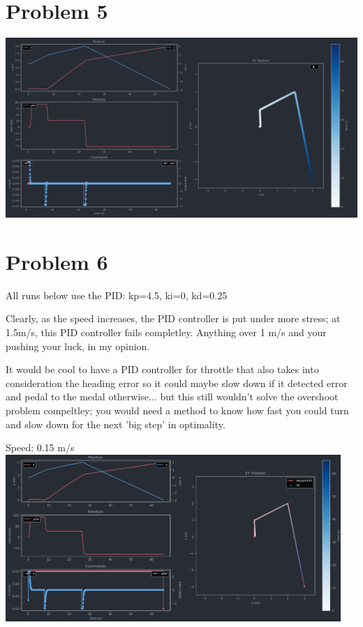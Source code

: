 \documentclass{article}
\begin{document}
    \section*{Problem 5}
        \raggedright
        \includegraphics[width=\linewidth]{Problem 5 Telemetry.png}

    \pagebreak
    \section*{Problem 6}
        \raggedright
        All runs below use the PID: kp=4.5, ki=0, kd=0.25 \break

        Clearly, as the speed increases, the PID controller is put under more stress; at 1.5m/s, this PID controller fails completley.
        Anything over 1 m/s and your pushing your luck, in my opinion. \break

        It would be cool to have a PID controller for throttle that also takes into consideration the heading error so it could maybe slow down if it detected error and pedal to the medal otherwise... but this still wouldn't solve the overshoot problem compeltley; you would need a method to know how fast you could turn and slow down for the next 'big step' in optimality. \break

        \begin{minipage}{\linewidth}
            \raggedright
            Speed: 0.15 m/s \break
            \includegraphics[width=5in]{Problem 6 Telemetry 0o15.png} \break
        \end{minipage}
\end{document}
